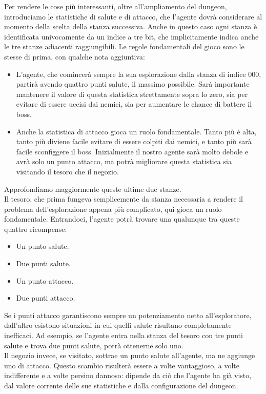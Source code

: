 \documentclass{book}
\theoremstyle{definition}
\theoremstyle{definition}
\theoremstyle{definition}
\theoremstyle{plain}
\theoremstyle{plain}
\theoremstyle{plain}
\theoremstyle{plain}
\begin{document}
Per rendere le cose più interessanti, oltre all'ampliamento del dungeon, introduciamo le statistiche di salute e di attacco, che l'agente dovrà considerare al momento della scelta della stanza successiva. Anche in questo caso ogni stanza è identificata univocamente da un indice a tre bit, che implicitamente indica anche le tre stanze adiacenti raggiungibili. Le regole fondamentali del gioco sono le stesse di prima, con qualche nota aggiuntiva:
\begin{itemize}
    \item L'agente, che comincerà sempre la sua esplorazione dalla stanza di indice 000, partirà avendo quattro punti salute, il massimo possibile. Sarà importante mantenere il valore di questa statistica strettamente sopra lo zero, sia per evitare di essere uccisi dai nemici, sia per aumentare le chance di battere il boss.
    \item Anche la statistica di attacco gioca un ruolo fondamentale. Tanto più è alta, tanto più diviene facile evitare di essere colpiti dai nemici, e tanto più sarà facile sconfiggere il boss. Inizialmente il nostro agente sarà molto debole e avrà solo un punto attacco, ma potrà migliorare questa statistica sia visitando il tesoro che il negozio.
\end{itemize}
Approfondiamo maggiormente queste ultime due stanze.\\
Il tesoro, che prima fungeva semplicemente da stanza necessaria a rendere il problema dell'esplorazione appena più complicato, qui gioca un ruolo fondamentale. Entrandoci, l'agente potrà trovare una qualunque tra queste quattro ricompense:
\begin{itemize}
    \item Un punto salute.
    \item Due punti salute.
    \item Un punto attacco.
    \item Due punti attacco.
\end{itemize}
Se i punti attacco garantiscono sempre un potenziamento netto all'esploratore, dall'altro esistono situazioni in cui quelli salute risultano completamente inefficaci. Ad esempio, se l'agente entra nella stanza del tesoro con tre punti salute e trova due punti salute, potrà ottenerne solo uno.\\
Il negozio invece, se visitato, sottrae un punto salute all'agente, ma ne aggiunge uno di attacco. Questo scambio risulterà essere a volte vantaggioso, a volte indifferente e a volte persino dannoso: dipende da ciò che l'agente ha già visto, dal valore corrente delle sue statistiche e dalla configurazione del dungeon.\\
\end{document}

